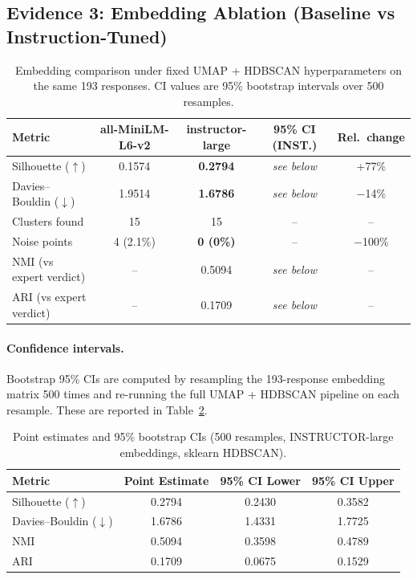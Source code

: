 \documentclass[11pt]{article}
\begin{document}
\subsection{Evidence 3: Embedding Ablation (Baseline vs Instruction-Tuned)}
\begin{table}[ht]
\centering
\caption{Embedding comparison under fixed UMAP + HDBSCAN hyperparameters on the same 193 responses. CI values are 95\% bootstrap intervals over 500 resamples.}
\label{tab:embedding_ablation}
\begin{tabular}{lcccc}
\toprule
Metric & all-MiniLM-L6-v2 & instructor-large & 95\% CI (INST.) & Rel.\ change \\
\midrule
Silhouette ($\uparrow$) & 0.1574 & \textbf{0.2794} & \textit{see below} & +77\% \\
Davies--Bouldin ($\downarrow$) & 1.9514 & \textbf{1.6786} & \textit{see below} & $-$14\% \\
Clusters found & 15 & 15 & -- & -- \\
Noise points & 4 (2.1\%) & \textbf{0 (0\%)} & -- & $-$100\% \\
NMI (vs expert verdict) & -- & 0.5094 & \textit{see below} & -- \\
ARI (vs expert verdict) & -- & 0.1709 & \textit{see below} & -- \\
\bottomrule
\end{tabular}
\end{table}

\paragraph{Confidence intervals.}
Bootstrap 95\% CIs are computed by resampling the 193-response embedding matrix 500 times and re-running the full UMAP + HDBSCAN pipeline on each resample. These are reported in Table~\ref{tab:bootstrap_ci}.

\begin{table}[ht]
\centering
\caption{Point estimates and 95\% bootstrap CIs (500 resamples, INSTRUCTOR-large embeddings, sklearn HDBSCAN).}
\label{tab:bootstrap_ci}
\begin{tabular}{lccc}
\toprule
Metric & Point Estimate & 95\% CI Lower & 95\% CI Upper \\
\midrule
Silhouette ($\uparrow$) & 0.2794 & 0.2430 & 0.3582 \\
Davies--Bouldin ($\downarrow$) & 1.6786 & 1.4331 & 1.7725 \\
NMI & 0.5094 & 0.3598 & 0.4789 \\
ARI & 0.1709 & 0.0675 & 0.1529 \\
\bottomrule
\end{tabular}
\end{table}
\end{document}
